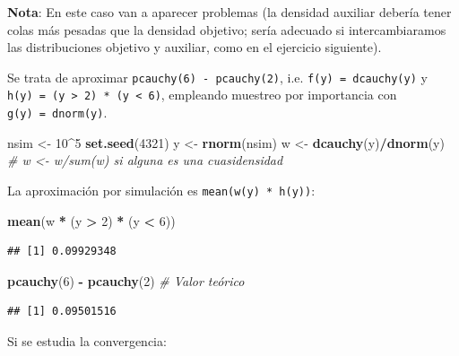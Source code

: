\documentclass[]{book}
\newenvironment{Shaded}{\begin{snugshade}}{\end{snugshade}}
\newcommand{\KeywordTok}[1]{\textcolor[rgb]{0.13,0.29,0.53}{\textbf{#1}}}
\newcommand{\DecValTok}[1]{\textcolor[rgb]{0.00,0.00,0.81}{#1}}
\newcommand{\StringTok}[1]{\textcolor[rgb]{0.31,0.60,0.02}{#1}}
\newcommand{\CommentTok}[1]{\textcolor[rgb]{0.56,0.35,0.01}{\textit{#1}}}
\newcommand{\OperatorTok}[1]{\textcolor[rgb]{0.81,0.36,0.00}{\textbf{#1}}}
\newcommand{\NormalTok}[1]{#1}
\theoremstyle{definition}
\theoremstyle{definition}
\theoremstyle{definition}
\theoremstyle{remark}
\begin{document}
\textbf{Nota}: En este caso van a aparecer problemas (la densidad
auxiliar debería tener colas más pesadas que la densidad objetivo; sería
adecuado si intercambiaramos las distribuciones objetivo y auxiliar,
como en el ejercicio siguiente).

Se trata de aproximar \texttt{pcauchy(6)\ -\ pcauchy(2)}, i.e.
\texttt{f(y)\ =\ dcauchy(y)} y
\texttt{h(y)\ =\ (y\ \textgreater{}\ 2)\ *\ (y\ \textless{}\ 6)},
empleando muestreo por importancia con \texttt{g(y)\ =\ dnorm(y)}.

\begin{Shaded}
\begin{Highlighting}[]
\NormalTok{nsim <-}\StringTok{ }\DecValTok{10}\OperatorTok{^}\DecValTok{5}
\KeywordTok{set.seed}\NormalTok{(}\DecValTok{4321}\NormalTok{)}
\NormalTok{y <-}\StringTok{ }\KeywordTok{rnorm}\NormalTok{(nsim)}
\NormalTok{w <-}\StringTok{ }\KeywordTok{dcauchy}\NormalTok{(y)}\OperatorTok{/}\KeywordTok{dnorm}\NormalTok{(y) }\CommentTok{# w <- w/sum(w) si alguna es una cuasidensidad}
\end{Highlighting}
\end{Shaded}

La aproximación por simulación es \texttt{mean(w(y)\ *\ h(y))}:

\begin{Shaded}
\begin{Highlighting}[]
\KeywordTok{mean}\NormalTok{(w }\OperatorTok{*}\StringTok{ }\NormalTok{(y }\OperatorTok{>}\StringTok{ }\DecValTok{2}\NormalTok{) }\OperatorTok{*}\StringTok{ }\NormalTok{(y }\OperatorTok{<}\StringTok{ }\DecValTok{6}\NormalTok{)) }
\end{Highlighting}
\end{Shaded}

\begin{verbatim}
## [1] 0.09929348
\end{verbatim}

\begin{Shaded}
\begin{Highlighting}[]
\KeywordTok{pcauchy}\NormalTok{(}\DecValTok{6}\NormalTok{) }\OperatorTok{-}\StringTok{ }\KeywordTok{pcauchy}\NormalTok{(}\DecValTok{2}\NormalTok{)  }\CommentTok{# Valor teórico}
\end{Highlighting}
\end{Shaded}

\begin{verbatim}
## [1] 0.09501516
\end{verbatim}

Si se estudia la convergencia:
\end{document}
